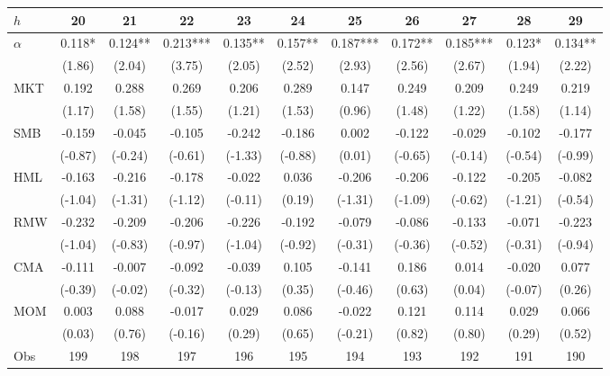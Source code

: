 \begin{tabular}{lcccccccccc}
\toprule
$h$ & 20 & 21 & 22 & 23 & 24 & 25 & 26 & 27 & 28 & 29 \\
\midrule
$\alpha$ & 0.118* & 0.124** & 0.213*** & 0.135** & 0.157** & 0.187*** & 0.172** & 0.185*** & 0.123* & 0.134** \\
 & (1.86) & (2.04) & (3.75) & (2.05) & (2.52) & (2.93) & (2.56) & (2.67) & (1.94) & (2.22) \\
MKT & 0.192 & 0.288 & 0.269 & 0.206 & 0.289 & 0.147 & 0.249 & 0.209 & 0.249 & 0.219 \\
 & (1.17) & (1.58) & (1.55) & (1.21) & (1.53) & (0.96) & (1.48) & (1.22) & (1.58) & (1.14) \\
SMB & -0.159 & -0.045 & -0.105 & -0.242 & -0.186 & 0.002 & -0.122 & -0.029 & -0.102 & -0.177 \\
 & (-0.87) & (-0.24) & (-0.61) & (-1.33) & (-0.88) & (0.01) & (-0.65) & (-0.14) & (-0.54) & (-0.99) \\
HML & -0.163 & -0.216 & -0.178 & -0.022 & 0.036 & -0.206 & -0.206 & -0.122 & -0.205 & -0.082 \\
 & (-1.04) & (-1.31) & (-1.12) & (-0.11) & (0.19) & (-1.31) & (-1.09) & (-0.62) & (-1.21) & (-0.54) \\
RMW & -0.232 & -0.209 & -0.206 & -0.226 & -0.192 & -0.079 & -0.086 & -0.133 & -0.071 & -0.223 \\
 & (-1.04) & (-0.83) & (-0.97) & (-1.04) & (-0.92) & (-0.31) & (-0.36) & (-0.52) & (-0.31) & (-0.94) \\
CMA & -0.111 & -0.007 & -0.092 & -0.039 & 0.105 & -0.141 & 0.186 & 0.014 & -0.020 & 0.077 \\
 & (-0.39) & (-0.02) & (-0.32) & (-0.13) & (0.35) & (-0.46) & (0.63) & (0.04) & (-0.07) & (0.26) \\
MOM & 0.003 & 0.088 & -0.017 & 0.029 & 0.086 & -0.022 & 0.121 & 0.114 & 0.029 & 0.066 \\
 & (0.03) & (0.76) & (-0.16) & (0.29) & (0.65) & (-0.21) & (0.82) & (0.80) & (0.29) & (0.52) \\
Obs & 199 & 198 & 197 & 196 & 195 & 194 & 193 & 192 & 191 & 190 \\
\bottomrule
\end{tabular}

